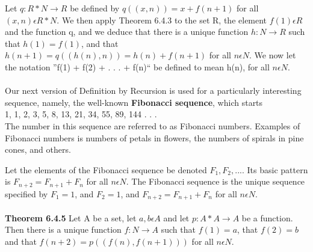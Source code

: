 \documentclass[a4paper,10pt]{report}
\begin{document}
Let $q : R * N \rightarrow R$ be defined by $q((x, n)) = x + f (n + 1)$ for all $(x, n) \epsilon R * N$. We then apply Theorem 6.4.3 to the set R, the element $f(1)\epsilon R$ and the function q, and we deduce that there is a unique function $h : N \rightarrow R$ such that $h(1) = f(1)$, and that $h(n + 1) = q((h(n), n)) = h(n) + f (n + 1)$ for all $n\epsilon N$. We now let the notation ''f(1) + f(2) + . . . + f(n)`` be defined to mean h(n), for all $n\epsilon N$.
\\
\\
Our next version of Definition by Recursion is used for a particularly interesting sequence, namely, the well-known {\bf Fibonacci sequence}, which starts \\1, 1, 2, 3, 5, 8, 13, 21, 34, 55, 89, 144 . . .\\ The number in this sequence are referred to as Fibonacci numbers. Examples of Fibonacci numbers is numbers of petals in flowers, the numbers of spirals in pine cones, and others.

Let the elements of the Fibonacci sequence be denoted $F_1, F_2, . . . .$ Its basic pattern is $F_{n+2}=F_{n+1}+F_n$ for all $n\epsilon N$. The Fibonacci sequence is the unique sequence specified by $F_1=1$, and $F_2=1$, and $F_{n+2}=F_{n+1}+F_n$ for all $n\epsilon N$.
\\\\
{\bf Theorem 6.4.5} Let A be a set, let $a, b \epsilon A$ and let $p : A * A \rightarrow A$ be a function. Then there is a unique function $f : N \rightarrow A$ such that $f (1) = a$, that $f (2) = b$ and that $f (n + 2) = p(( f (n), f (n + 1)))$ for all $n \epsilon N$. 
\end{document}
